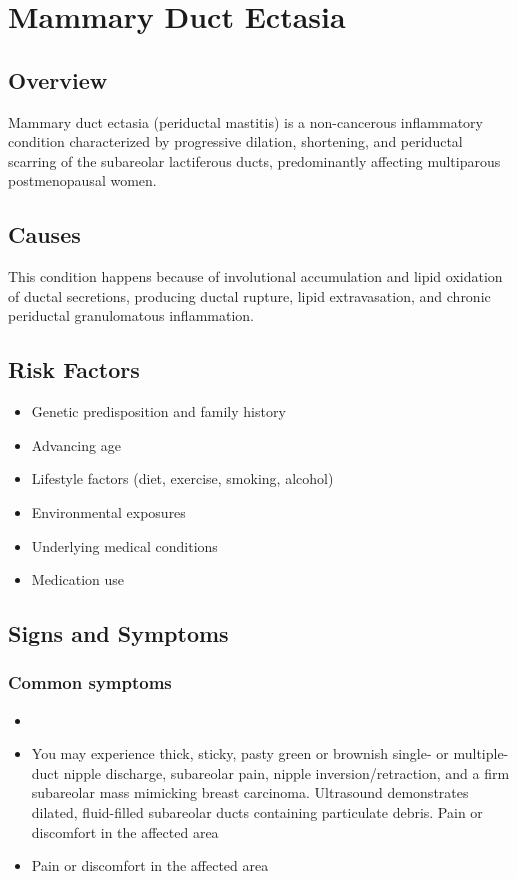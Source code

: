 \chapter{Mammary Duct Ectasia}
\label{sec:Mammary Duct Ectasia}

\section{Overview}
Mammary duct ectasia (periductal mastitis) is a non-cancerous inflammatory condition characterized by progressive dilation, shortening, and periductal scarring of the subareolar lactiferous ducts, predominantly affecting multiparous postmenopausal women.
\section{Causes}
This condition happens because of involutional accumulation and lipid oxidation of ductal secretions, producing ductal rupture, lipid extravasation, and chronic periductal granulomatous inflammation.     
\section{Risk Factors}

\begin{itemize}[noitemsep]
  \item Genetic predisposition and family history
  \item Advancing age
  \item Lifestyle factors (diet, exercise, smoking, alcohol)
  \item Environmental exposures
  \item Underlying medical conditions
  \item Medication use
\end{itemize}
\section{Signs and Symptoms}

\subsection{Common symptoms}
\begin{itemize}[noitemsep]
  \item \item You may experience thick, sticky, pasty green or brownish single- or multiple-duct nipple discharge, subareolar pain, nipple inversion/retraction, and a firm subareolar mass mimicking breast carcinoma. Ultrasound demonstrates dilated, fluid-filled subareolar ducts containing particulate debris. Pain or discomfort in the affected area    \item Pain or discomfort in the affected area
  \end{itemize}

